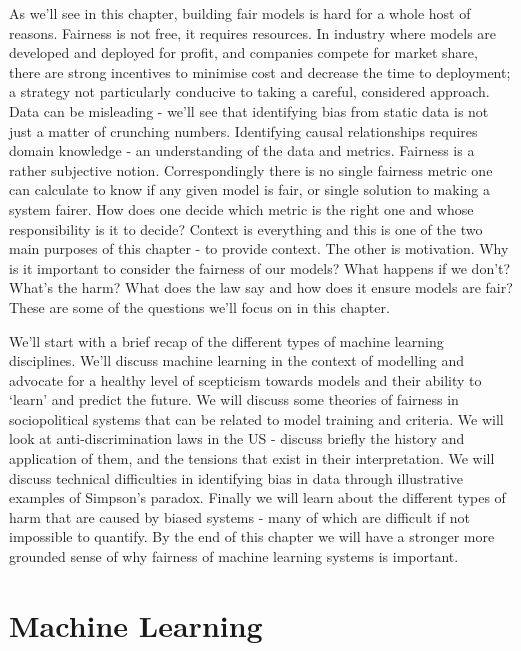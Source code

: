As we'll see in this chapter, building fair models is hard for a whole host of reasons. Fairness is not free, it requires resources. In industry where models are developed and deployed for profit, and companies compete for market share, there are strong incentives to minimise cost and decrease the time to deployment; a strategy not particularly conducive to taking a careful, considered approach. Data can be misleading - we'll see that identifying bias from static data is not just a matter of crunching numbers. Identifying causal relationships requires domain knowledge - an understanding of the data and metrics. Fairness is a rather subjective notion. Correspondingly there is no single fairness metric one can calculate to know if any given model is fair, or single solution to making a system fairer. How does one decide which metric is the right one and whose responsibility is it to decide? Context is everything and this is one of the two main purposes of this chapter - to provide context. The other is motivation. Why is it important to consider the fairness of our models? What happens if we don't? What's the harm? What does the law say and how does it ensure models are fair? These are some of the questions we'll focus on in this chapter.

We'll start with a brief recap of the different types of machine learning disciplines. We'll discuss machine learning in the context of modelling and advocate for a healthy level of scepticism towards models and their ability to `learn' and predict the future. We will discuss some theories of fairness in sociopolitical systems that can be related to model training and criteria. We will look at anti-discrimination laws in the US - discuss briefly the history and application of them, and the tensions that exist in their interpretation. We will discuss technical difficulties in identifying bias in data through illustrative examples of Simpson's paradox. Finally we will learn about the different types of harm that are caused by biased systems - many of which are difficult if not impossible to quantify. By the end of this chapter we will have a stronger more grounded sense of why fairness of machine learning systems is important.

\section{Machine Learning}

